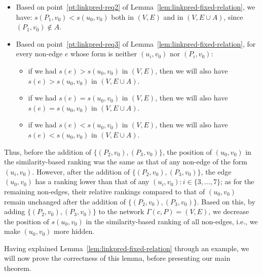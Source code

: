 \documentclass[twocolumn]{article}
\begin{document}
\begin{itemize}
\begin{itemize}
    \item Based on point~\ref{pt:linkpred-req2} of Lemma~\ref{lem:linkpred-fixed-relation}, we have: $s(P_1,v_0) < s(u_0,v_0)$ both in $(V,E)$ and in $(V, E\cup A)$, since $(P_1,v_0)\not\in A$.
    \item Based on point~\ref{pt:linkpred-req3} of Lemma~\ref{lem:linkpred-fixed-relation}, for every non-edge $e$ whose form is neither $(u_i,v_0)$ nor $(P_i,v_0)$:
        \begin{itemize}
        \item if we had $s(e)>s(u_0,v_0)$ in  $(V,E)$, then we will also have $s(e)>s(u_0,v_0)$ in  $(V,E\cup A)$.
        \item if we had $s(e)=s(u_0,v_0)$ in  $(V,E)$, then we will also have $s(e)=s(u_0,v_0)$ in  $(V,E\cup A)$.
        \item if we had $s(e)<s(u_0,v_0)$ in  $(V,E)$, then we will also have $s(e)<s(u_0,v_0)$ in  $(V,E\cup A)$.
        \end{itemize}        
    \end{itemize}
\end{itemize}

\noindent Thus, before the addition of $\{(P_2,v_0),(P_3,v_0)\}$, the position of $(u_0,v_0)$ in the similarity-based ranking was the same as that of any non-edge of the form $(u_i,v_0)$. However, after the addition of $\{(P_2,v_0),(P_3,v_0)\}$, the edge $(u_0,v_0)$ has a ranking lower than that of any $(u_i,v_0):i\in\{3,\ldots,7\}$; as for the remaining non-edges, their relative rankings compared to that of $(u_0,v_0)$ remain unchanged after the addition of $\{(P_2,v_0),(P_3,v_0)\}$. Based on this, by adding $\{(P_2,v_0),(P_3,v_0)\}$ to the network $\Gamma(c,P)=(V,E)$, we decrease the position of $s(u_0,v_0)$ in the similarity-based ranking of all non-edges, i.e., we make $(u_0,v_0)$ more hidden.

Having explained Lemma~\ref{lem:linkpred-fixed-relation} through an example, we will now prove the correctness of this lemma, before presenting our main theorem.
\end{document}
